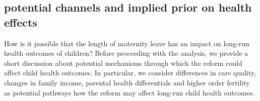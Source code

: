 \documentclass[11pt, a4paper,draft]{article} %
\begin{document}
\subsection{potential channels and implied prior on health effects}
How is it possible that the length of maternity leave has an impact on long-run health outcomes of children? Before proceeding with the analysis, we provide a short discussion about potential mechanisms through which the reform could affect child health outcomes. In particular, we consider differences in care quality, changes in family income, parental health differentials and higher order fertility as potential pathways how the reform may affect long-run child health outcomes.  \newline
\end{document}
